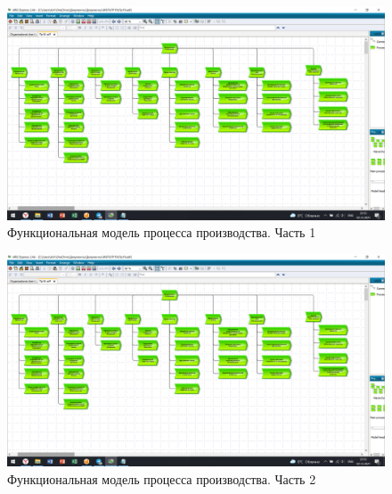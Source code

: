 \documentclass[a4paper,14pt]{extarticle}
\begin{document}
\begin{figure}[htpb]
	\centering
	\includegraphics[width=1\linewidth]{images/pr-19/top}
	\caption{Функциональная модель процесса производства. Часть 1}
	\label{fig:1}
\end{figure}

\begin{figure}[htpb]
	\centering
	\includegraphics[width=1\linewidth]{images/pr-19/top}
	\caption{Функциональная модель процесса производства. Часть 2}
	\label{fig:2}
\end{figure}



%
%
\end{document}
